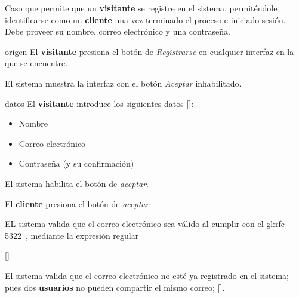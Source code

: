 %
%

{
  Caso que permite que un \textbf{visitante} se registre en el sistema,
  permiténdole identificarse como un \textbf{cliente} una vez terminado el
  proceso e iniciado sesión. Debe proveer su nombre, correo electrónico y
  una contraseña.

  \begin{trayectoriaPrincipal}

    \item[origen] El \textbf{visitante} presiona el botón de
      \textit{Registrarse} en cualquier interfaz en la que se
      encuentre.

    \item El sistema muestra la interfaz 
      con el botón \textit{Aceptar} inhabilitado.

    \item[datos] El \textbf{visitante} introduce los siguientes datos
      []:
      \begin{itemize}
        \item Nombre
        \item Correo electrónico
        \item Contraseña (y su confirmación)
      \end{itemize}

    \item El sistema habilita el botón de \textit{aceptar}.

    \item El \textbf{cliente} presiona el botón de \textit{aceptar}.

    \item EL sistema valida que el correo electrónico sea válido
      al cumplir con el \gls{gl:rfc}
      5322~\cite{DBLP:journals/rfc/rfc5322}, mediante la expresión
      regular


      []

    \item El sistema valida que el correo electrónico no esté ya
      registrado en el sistema; pues dos \textbf{usuarios} no pueden
      compartir el mismo correo;
      [].



\end{trayectoriaPrincipal}}
